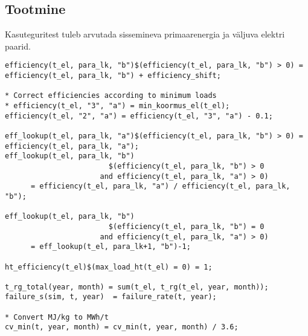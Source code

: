 \subsection{Tootmine}
Kasuteguritest tuleb arvutada sissemineva primaarenergia ja väljuva elektri paarid. 

\begin{verbatim}
efficiency(t_el, para_lk, "b")$(efficiency(t_el, para_lk, "b") > 0) = efficiency(t_el, para_lk, "b") + efficiency_shift;

* Correct efficiencies according to minimum loads
* efficiency(t_el, "3", "a") = min_koormus_el(t_el);
efficiency(t_el, "2", "a") = efficiency(t_el, "3", "a") - 0.1;

eff_lookup(t_el, para_lk, "a")$(efficiency(t_el, para_lk, "b") > 0) = efficiency(t_el, para_lk, "a");
eff_lookup(t_el, para_lk, "b")
                        $(efficiency(t_el, para_lk, "b") > 0
                      and efficiency(t_el, para_lk, "a") > 0)
      = efficiency(t_el, para_lk, "a") / efficiency(t_el, para_lk, "b");

eff_lookup(t_el, para_lk, "b")
                        $(efficiency(t_el, para_lk, "b") = 0
                      and efficiency(t_el, para_lk, "a") > 0)
      = eff_lookup(t_el, para_lk+1, "b")-1;

ht_efficiency(t_el)$(max_load_ht(t_el) = 0) = 1;

t_rg_total(year, month) = sum(t_el, t_rg(t_el, year, month));
failure_s(sim, t, year)  = failure_rate(t, year);

* Convert MJ/kg to MWh/t
cv_min(t, year, month) = cv_min(t, year, month) / 3.6;
\end{verbatim}

